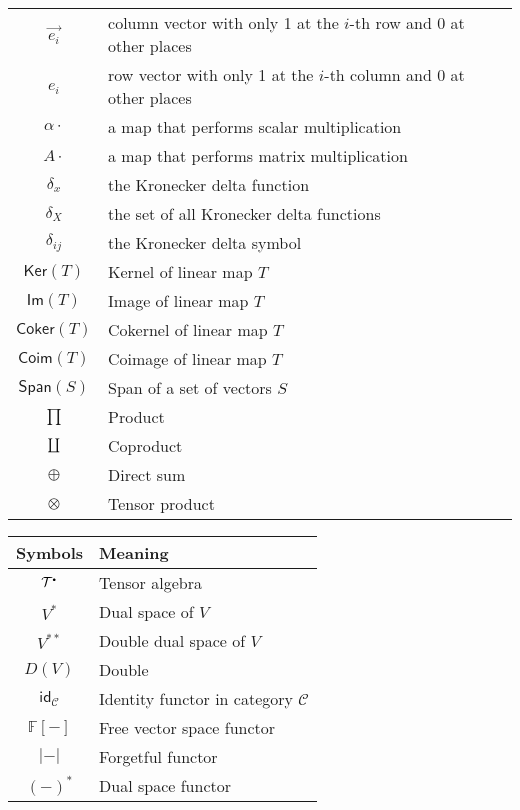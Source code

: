 \documentclass[
	11pt, %
	fleqn, %
	a4paper, %
]{LegrandOrangeBook}
\newcommand{\smallbullet}{\scalebox{0.5}{$\bullet$}}
\renewcommand{\ker}[1]{\mathsf{Ker}(#1)} %
\renewcommand{\Im}[1]{\mathsf{Im}(#1)} %
\renewcommand{\span}[1]{\mathsf{Span}(#1)} %
\newcommand{\F}{\mathbb{F}} %
\newcommand{\coker}[1]{\mathsf{Coker}(#1)} %
\newcommand{\coim}[1]{\mathsf{Coim}(#1)} %
\newcommand{\id}{\mathsf{id}} %
\newcommand{\C}{\mathcal{C}} %
\newcommand{\T}{\mathcal{T}^{\smallbullet}} %
\DeclareRobustCommand{\coprod}{\mathop{\text{\fakecoprod}}}
\newcommand{\fakecoprod}{%
    \sbox0{$\prod$}%
    \smash{\raisebox{\dimexpr.9625\depth-\dp0}{\scalebox{1}[-1]{$\prod$}}}%
    \vphantom{$\prod$}%
}
\begin{document}
\begin{tabularx}{\textwidth}{cX}
    $\vec{e_i}$ & column vector with only 1 at the $i$-th row and 0 at other places \\
    $\hat{e_i}$ & row vector with only 1 at the $i$-th column and 0 at other places \\
    \midrule
    $\alpha \cdot$ & a map that performs scalar multiplication \\
    $A \cdot$ & a map that performs matrix multiplication \\
    \midrule
    $\delta_x$ & the Kronecker delta function \\
    $\delta_X$ & the set of all Kronecker delta functions \\
    $\delta_{ij}$ & the Kronecker delta symbol \\
    \midrule
    $\ker{T}$ & Kernel of linear map $T$ \\
    $\Im{T}$ & Image of linear map $T$ \\
    $\coker{T}$ & Cokernel of linear map $T$ \\
    $\coim{T}$ & Coimage of linear map $T$ \\
    $\span{S}$ & Span of a set of vectors $S$ \\
    \midrule
    $\prod$ & Product \\
    $\coprod$ & Coproduct \\
    $\oplus$ & Direct sum \\
    $\otimes$ & Tensor product \\
    \bottomrule
\end{tabularx}

\noindent \begin{tabularx}{\textwidth}{cX}
    \toprule
    \textbf{Symbols} & \textbf{Meaning} \\
    \midrule
    $\T$ & Tensor algebra \\
    \midrule
    $V^*$ & Dual space of $V$ \\
    $V^{**}$ & Double dual space of $V$ \\
    $D(V)$ & Double \\
    \midrule
    $\id_{\C}$ & Identity functor in category $\C$ \\
    $\F[-]$ & Free vector space functor \\
    $|-|$ & Forgetful functor \\
    $(-)^*$ & Dual space functor \\
    \bottomrule
\end{tabularx}


\end{document}
